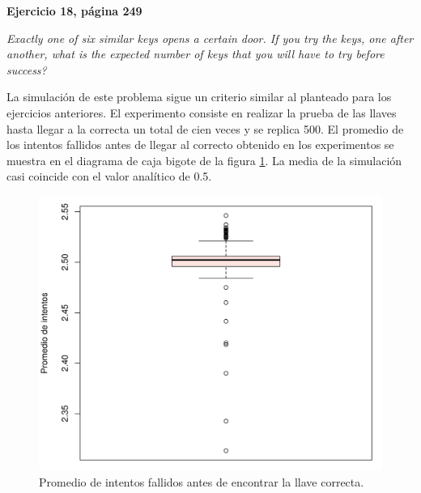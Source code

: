 \documentclass[12pt]{article}
\begin{document}
	{\bf Ejercicio 18, página 249}
	
	{\em Exactly one of six similar keys opens a certain door. If you try the keys, one after another, what is the expected number of keys that you will have to try before success?}
	
	La simulación de este problema sigue un criterio similar al planteado para los ejercicios anteriores. El experimento consiste en realizar la prueba de las llaves hasta llegar a la correcta un total de cien veces y se replica 500. El promedio de los intentos fallidos antes de llegar al correcto obtenido en los experimentos se muestra en el diagrama de caja bigote de la figura \ref{keys}. La media de la simulación casi coincide con el valor analítico de 0.5.
	
	\begin{figure}
		\centering
		\includegraphics[scale=0.5]{llaves.png}
		\caption{Promedio de intentos fallidos antes de encontrar la llave correcta.}
		\label{keys}
	\end{figure}

%	
	
\end{document}
